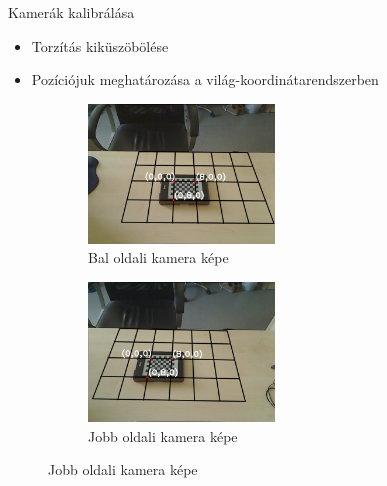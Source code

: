 \begin{frame}{Kamerák kalibrálása}

\begin{itemize}
\item Torzítás kiküszöbölése
\item Pozíciójuk meghatározása a világ-koordinátarendszerben
\end{itemize}

\begin{figure}[tbh]
\centering
\begin{subfigure}[b]{.49\linewidth}
	\centering
	\includegraphics[width=140pt]{figures/pose0_180.png}
	\caption{Bal oldali kamera képe}
  \end{subfigure}
\begin{subfigure}[b]{.49\linewidth}
	\centering
	\includegraphics[width=140pt]{figures/pose1_180.png}
	\caption{Jobb oldali kamera képe}
  \end{subfigure}
\end{figure}

\end{frame}


